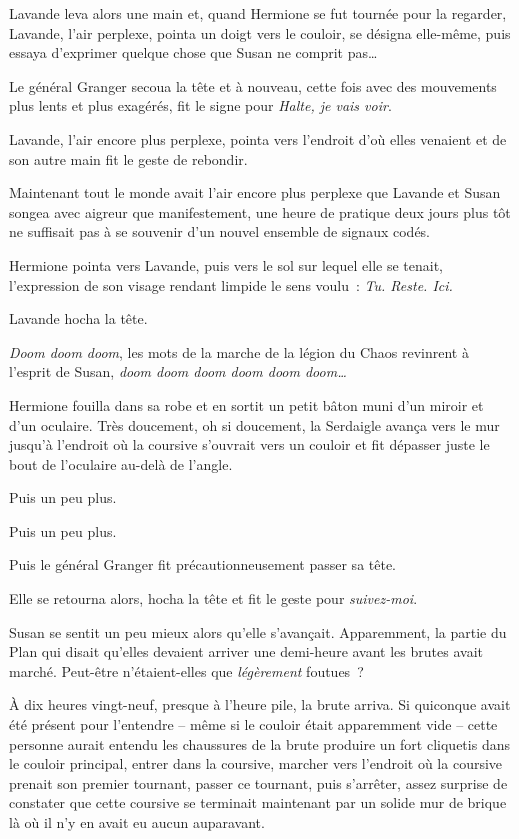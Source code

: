 Lavande leva alors une main et, quand Hermione se fut tournée pour la regarder, Lavande, l'air perplexe, pointa un doigt vers le couloir, se désigna elle-même, puis essaya d'exprimer quelque chose que Susan ne comprit pas…

Le général Granger secoua la tête et à nouveau, cette fois avec des mouvements plus lents et plus exagérés, fit le signe pour \emph{Halte, je vais voir}.

Lavande, l'air encore plus perplexe, pointa vers l'endroit d'où elles venaient et de son autre main fit le geste de rebondir.

Maintenant tout le monde avait l'air encore plus perplexe que Lavande et Susan songea avec aigreur que manifestement, une heure de pratique deux jours plus tôt ne suffisait pas à se souvenir d'un nouvel ensemble de signaux codés.

Hermione pointa vers Lavande, puis vers le sol sur lequel elle se tenait, l'expression de son visage rendant limpide le sens voulu~: \emph{Tu. Reste. Ici.}

Lavande hocha la tête.

\emph{Doom doom doom}, les mots de la marche de la légion du Chaos revinrent à l'esprit de Susan, \emph{doom doom doom doom doom doom…}\footnotemark{}

Hermione fouilla dans sa robe et en sortit un petit bâton muni d'un miroir et d'un oculaire. Très doucement, oh si doucement, la Serdaigle avança vers le mur jusqu'à l'endroit où la coursive s'ouvrait vers un couloir et fit dépasser juste le bout de l'oculaire au-delà de l'angle.

Puis un peu plus.

Puis un peu plus.

Puis le général Granger fit précautionneusement passer sa tête.

Elle se retourna alors, hocha la tête et fit le geste pour \emph{suivez-moi}.

Susan se sentit un peu mieux alors qu'elle s'avançait. Apparemment, la partie du Plan qui disait qu'elles devaient arriver une demi-heure avant les brutes avait marché. Peut-être n'étaient-elles que \emph{légèrement} foutues~?

\later

À dix heures vingt-neuf, presque à l'heure pile, la brute arriva. Si quiconque avait été présent pour l'entendre -- même si le couloir était apparemment vide -- cette personne aurait entendu les chaussures de la brute produire un fort cliquetis dans le couloir principal, entrer dans la coursive, marcher vers l'endroit où la coursive prenait son premier tournant, passer ce tournant, puis s'arrêter, assez surprise de constater que cette coursive se terminait maintenant par un solide mur de brique là où il n'y en avait eu aucun auparavant.

